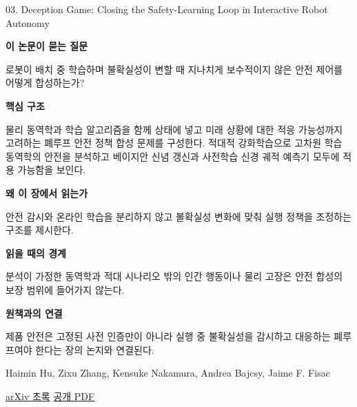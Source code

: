 \documentclass[11pt,openany]{book}
\begin{document}
\begin{termcard}{03. Deception Game: Closing the Safety-Learning Loop in Interactive Robot Autonomy}

\par

\medskip

{\sffamily\bfseries\color{deepblue} 이 논문이 묻는 질문}\par

로봇이 배치 중 학습하며 불확실성이 변할 때 지나치게 보수적이지 않은 안전 제어를 어떻게 합성하는가?

\smallskip

{\sffamily\bfseries\color{deepblue} 핵심 구조}\par

물리 동역학과 학습 알고리즘을 함께 상태에 넣고 미래 상황에 대한 적응 가능성까지 고려하는 폐루프 안전 정책 합성 문제를 구성한다. 적대적 강화학습으로 고차원 학습 동역학의 안전을 분석하고 베이지안 신념 갱신과 사전학습 신경 궤적 예측기 모두에 적용 가능함을 보인다.

\smallskip

{\sffamily\bfseries\color{deepblue} 왜 이 장에서 읽는가}\par

안전 감시와 온라인 학습을 분리하지 않고 불확실성 변화에 맞춰 실행 정책을 조정하는 구조를 제시한다.

\smallskip

{\sffamily\bfseries\color{coral} 읽을 때의 경계}\par

분석이 가정한 동역학과 적대 시나리오 밖의 인간 행동이나 물리 고장은 안전 합성의 보장 범위에 들어가지 않는다.

\smallskip

{\sffamily\bfseries\color{teal} 원책과의 연결}\par

제품 안전은 고정된 사전 인증만이 아니라 실행 중 불확실성을 감시하고 대응하는 폐루프여야 한다는 장의 논지와 연결된다.

\medskip

{\footnotesize\color{muted} Haimin Hu, Zixu Zhang, Kensuke Nakamura, Andrea Bajcsy, Jaime F. Fisac\par

\href{https://arxiv.org/abs/2309.01267}{arXiv 초록} \quad \href{https://arxiv.org/pdf/2309.01267}{공개 PDF}\par}

\end{termcard}
\end{document}
